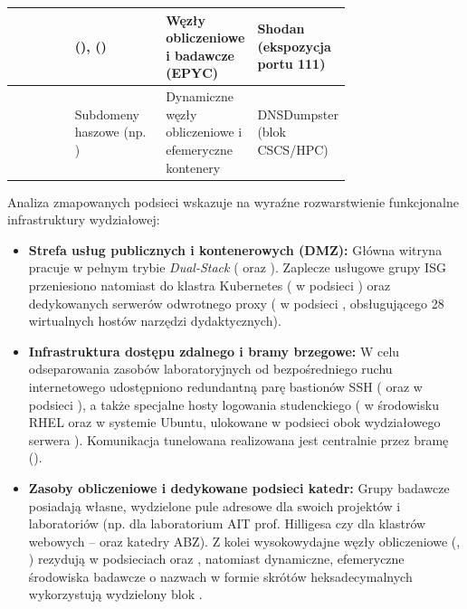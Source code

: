 \begin{table}[H]
\begin{tabularx}{\linewidth}{L{0.22\linewidth} L{0.28\linewidth} L{0.24\linewidth} Y}
\midrule
{} \newline {} &  (),  () & Węzły obliczeniowe i badawcze (EPYC) & Shodan (ekspozycja portu 111) \\
\midrule
{} & Subdomeny haszowe (np. ) & Dynamiczne węzły obliczeniowe i efemeryczne kontenery & DNSDumpster (blok CSCS/HPC) \\
\bottomrule
\end{tabularx}
\end{table}

Analiza zmapowanych podsieci wskazuje na wyraźne rozwarstwienie funkcjonalne infrastruktury wydziałowej:
\begin{itemize}
    \item \textbf{Strefa usług publicznych i kontenerowych (DMZ):} Główna witryna  pracuje w pełnym trybie \textit{Dual-Stack} ( oraz ). Zaplecze usługowe grupy ISG przeniesiono natomiast do klastra Kubernetes ( w podsieci ) oraz dedykowanych serwerów odwrotnego proxy ( w podsieci , obsługującego 28 wirtualnych hostów narzędzi dydaktycznych).
    \item \textbf{Infrastruktura dostępu zdalnego i bramy brzegowe:} W celu odseparowania zasobów laboratoryjnych od bezpośredniego ruchu internetowego udostępniono redundantną parę bastionów SSH ( oraz  w podsieci ), a także specjalne hosty logowania studenckiego ( w środowisku RHEL oraz  w systemie Ubuntu, ulokowane w podsieci  obok wydziałowego serwera ). Komunikacja tunelowana realizowana jest centralnie przez bramę  ().
    \item \textbf{Zasoby obliczeniowe i dedykowane podsieci katedr:} Grupy badawcze posiadają własne, wydzielone pule adresowe dla swoich projektów i laboratoriów (np.  dla laboratorium AIT prof. Hilligesa czy  dla klastrów webowych -- oraz katedry ABZ). Z kolei wysokowydajne węzły obliczeniowe (, ) rezydują w podsieciach  oraz , natomiast dynamiczne, efemeryczne środowiska badawcze o nazwach w formie skrótów heksadecymalnych wykorzystują wydzielony blok .
\end{itemize}

